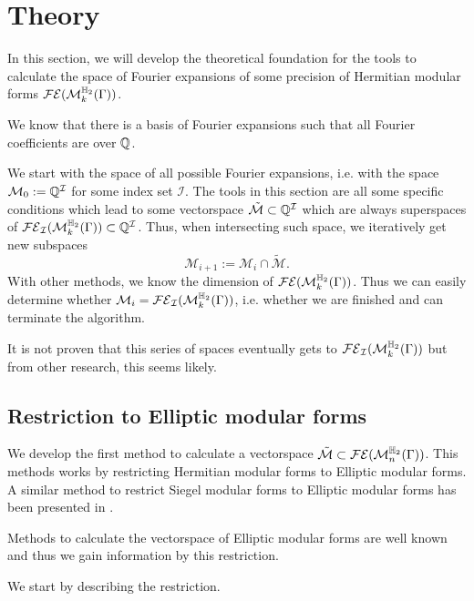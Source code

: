 
\section{Theory}


In this section, we will develop the theoretical foundation for the tools to calculate the space of Fourier expansions of some precision of Hermitian modular forms $\mathcal{FE}(\operatorname{\mathcal{M}}^{\mathbb{H}_{2}}_{k} (\Gamma))$.

We know that there is a basis of Fourier expansions such that all Fourier coefficients are over $\mathbb{Q}$. %

We start with the space of all possible Fourier expansions, i.e. with the space $\mathcal{M}_0 := \mathbb{Q}^\mathcal{I}$ for some index set $\mathcal{I}$. The tools in this section are all some specific conditions which lead to some vectorspace $\tilde{\mathcal{M}} \subset \mathbb{Q}^\mathcal{I}$ which are always superspaces of $\mathcal{FE}_\mathcal{I}(\operatorname{\mathcal{M}}^{\mathbb{H}_{2}}_{k} (\Gamma)) \subset \mathbb{Q}^\mathcal{I}$. Thus, when intersecting such space, we iteratively get new subspaces
\[ \mathcal{M}_{i+1} := \mathcal{M}_i \cap \tilde{\mathcal{M}} . \]
%
With other methods, we know the dimension of $\mathcal{FE}(\operatorname{\mathcal{M}}^{\mathbb{H}_{2}}_{k} (\Gamma))$. Thus we can easily determine whether $\mathcal{M}_i = \mathcal{FE}_\mathcal{I}(\operatorname{\mathcal{M}}^{\mathbb{H}_{2}}_{k} (\Gamma))$, i.e. whether we are finished and can terminate the algorithm.

It is not proven that this series of spaces eventually gets to $\mathcal{FE}_\mathcal{I}(\operatorname{\mathcal{M}}^{\mathbb{H}_{2}}_{k} (\Gamma))$ but from other research, this seems likely.

\subsection{Restriction to Elliptic modular forms}
\label{ellipticReduction}
\label{ellipticRestriction}

We develop the first method to calculate a vectorspace $\tilde{\mathcal{M}} \subset \mathcal{FE}(\operatorname{\mathcal{M}}^{\mathbb{H}_{2}}_{n} (\Gamma))$. This methods works by restricting Hermitian modular forms to Elliptic modular forms. A similar method to restrict Siegel modular forms to Elliptic modular forms has been presented in \cite{PoorYuen07Comp}.
 
Methods to calculate the vectorspace of Elliptic modular forms are well known and thus we gain information by this restriction.

We start by describing the restriction.

